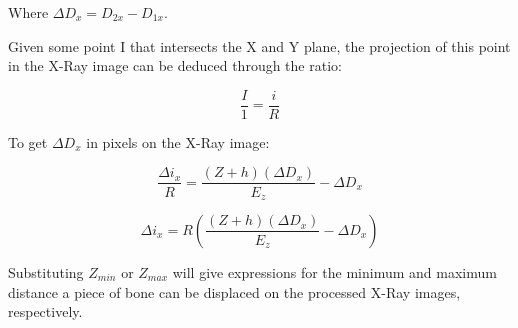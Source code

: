 Where $\Delta D_x = D_{2x} - D_{1x}$.

Given some point I that intersects the X and Y plane, the projection of this point in the X-Ray image can be deduced through the ratio:

\begin{equation}
\frac{I}{1} = \frac{i}{R}
\end{equation}

To get $\Delta D_x$ in pixels on the X-Ray image:

\begin{equation}
\frac{\Delta i_x}{R} = \frac{(Z + h)(\Delta D_x)}{E_z} - \Delta D_x
\end{equation}

\begin{equation}
\Delta i_x = R \left(\frac{(Z + h)(\Delta D_x)}{E_z} - \Delta D_x\right)
\end{equation}

Substituting $Z_{min}$ or $Z_{max}$ will give expressions for the minimum and maximum distance a piece of bone can be displaced on the processed X-Ray images, respectively.